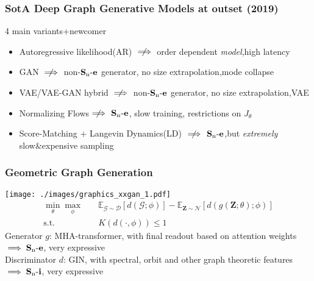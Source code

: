 \documentclass[./presentation.tex]{subfiles}
\begin{document}
\begin{frame}[label=ggg]
  \frametitle{SotA Deep Graph Generative Models at outset (2019)}
  \vspace{-1cm}
  \small
  4 main variants+newcomer
  \begin{itemize}
    \item Autoregressive likelihood(AR) $\centernot\implies$ order dependent \emph{model},high latency
    \item GAN %
      $\centernot\implies$ non-$\operatorname{\mathbf{S}_n\mathbf{-e}}$ generator, no size extrapolation,mode collapse
    \item VAE/VAE-GAN hybrid%
      $\centernot\implies$ non-$\operatorname{\mathbf{S}_n\mathbf{-e}}$ generator, no size extrapolation,VAE%
    \item Normalizing Flows$\centernot\implies$ $\operatorname{\mathbf{S}_n\mathbf{-e}}$, slow training, restrictions on $J_\theta$%
    \item Score-Matching + Langevin Dynamics(LD)  $\centernot\implies$ $\operatorname{\mathbf{S}_n\mathbf{-e}}$,but \emph{extremely} slow\&expensive sampling 
  \end{itemize}
\end{frame}


\begin{frame}[label=ggg,t]
  \frametitle{Geometric Graph Generation}
  \texttt{[image: ./images/graphics\_xxgan\_1.pdf]}
  \vspace{-0.5cm}
  \begin{align}
    \min_{\theta}\max_{\phi}&\quad\mathbb{E}_{\mathcal{G}\sim \mathcal{D}}\left[d\left(\mathcal{G};\phi\right)\right]-\mathbb{E}_{\mathbf{Z}\sim \mathcal{N}}\left[d\left(g(\mathbf{Z};\theta);\phi\right)\right]\nonumber\\
    \text{s.t.}&\quad K\left(d\left(\cdot,\phi\right)\right)\leq 1\nonumber
  \end{align}
  \vspace{-0.25cm}
  Generator $g$: MHA-transformer, with final readout based on attention weights\\$\implies\operatorname{\mathbf{S}_n\mathbf{-e}}$, very expressive\\
  Discriminator $d$: GIN, with spectral, orbit and other graph theoretic features\\$\implies\operatorname{\mathbf{S}_n\mathbf{-i}}$, very expressive
\end{frame}
\end{document}
